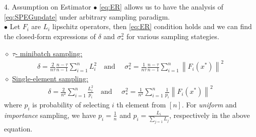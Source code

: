\documentclass[24pt,final]{beamer}
\newlength{\onecolwid}
\begin{document}
\begin{frame}[t]
\begin{columns}[t]
\begin{column}{\onecolwid}
\begin{block}{4. Assumption on Estimator}
    $\bullet$ \ref{eq:ER} allows us to have the analysis of \ref{eq:SPEGupdate} under arbitrary sampling paradigm. \\
    $\bullet$ Let $F_i$ are $L_i$ lipschitz operators, then \ref{eq:ER} condition holds and we can find the closed-form expressions of $\delta$ and $\sigma_*^2$ for various sampling stategies. \\
    \begin{tcolorbox}[colback=orange!5!white,colframe=orange!50!black,title={Closed-form expressions:}]
   $\diamond$ \underline{$\tau$- minibatch sampling:}
    \begin{eqnarray*}
        \delta = \frac{2}{n \tau} \frac{n - \tau}{n - 1} \sum_{i = 1}^n L_i^2 \quad \text{and } \quad \sigma_*^2 = \frac{1}{n \tau} \frac{n - \tau}{n - 1} \sum_{i = 1}^n \left\| F_i(x^*) \right\|^2
    \end{eqnarray*} 
    $\diamond$ \underline{Single-element sampling:}
    \begin{eqnarray*}
        \delta = \frac{2}{n^2} \sum_{i = 1}^n \frac{L_i^2}{p_i} \quad \text{and } \quad \sigma_*^2 = \frac{1}{n^2} \sum_{i = 1}^n \frac{1}{p_i} \left\| F_i(x^*)\right\|^2
    \end{eqnarray*}
    where $p_i$ is probability of selecting $i$ th element from $[n]$. For \textit{uniform} and \textit{importance} sampling, we have $p_i = \frac{1}{n}$ and $p_i = \frac{L_i}{\sum_{j = 1} L_j}$, respectively in the above equation.
\end{tcolorbox}


\end{block}

\end{column} %
		






\end{columns}
\end{frame}
\end{document}
